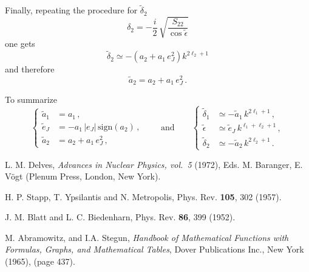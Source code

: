 \documentclass[10pt,a4paper]{article}
\newcommand{\mand}{\qquad\text{and}\qquad}
\newcommand{\mtm}[1]{\mathrm{#1}}
\begin{document}
\begin{appendices}
		Finally, repeating the procedure for $\tilde{\delta}_2$ 
		\begin{equation}
			\delta_2 = -\frac{i}{2}\,\sqrt{\frac{S_{22}}{\cos\tilde{\epsilon}}}
		\end{equation}
		one gets
		\begin{equation}
			\tilde{\delta}_2 \simeq
			-(a_2+a_1\,e_J^2)k^{2\ell_2+1}
		\end{equation}
		and therefore
		\begin{equation}
			\tilde{a}_2 = a_2+a_1\,e_J^2\,.
		\end{equation}
		
		To summarize
		\begin{equation}
			\begin{cases}
				\tilde{a}_1 &= a_1\,,\\
				\tilde{e}_J &=
				-a_1\,|e_J|\,\mtm{sign}(a_2)\,,\\
				\tilde{a}_2 &= a_2+a_1\,e_J^2\,,
			\end{cases}
			\mand
			\begin{cases}
				\tilde{\delta}_1 &\simeq - \tilde{a}_1\,k^{2\ell_1+1}\,,\\
				\tilde{\epsilon} &	\simeq
				\tilde{e}_J\,k^{\ell_1+\ell_2+1}\,,\\
				\tilde{\delta}_2 & \simeq -
				\tilde{a}_2\,k^{2\ell_2+1}\,.
			\end{cases}
		\end{equation}
		
		
		
	\end{appendices}
	
	
	\begin{thebibliography}{9}
		L. M. Delves, \textit{Advances in Nuclear Physics, vol.~5} (1972), Eds. M. Baranger, E. V\"ogt (Plenum Press, London, New York).
		
		H. P. Stapp, T. Ypsilantis and N. Metropolis, Phys. Rev. \textbf{105}, 302 (1957).
		
		J. M. Blatt and L. C. Biedenharn, Phys. Rev. \textbf{86}, 399 (1952).
		
		M. Abramowitz, and I.A. Stegun, \textit{Handbook of Mathematical Functions with Formulas, Graphs, and Mathematical Tables}, Dover Publications Inc., New York (1965), (page 437).
		
		
	\end{thebibliography}
	
\end{document}
